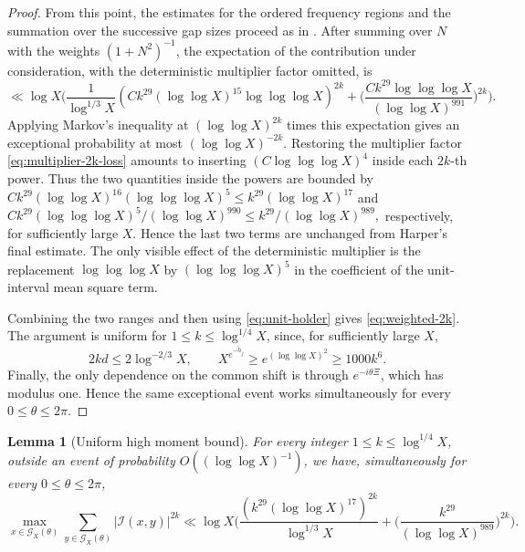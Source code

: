 \documentclass[a4paper,12pt,reqno]{amsart}
\numberwithin{equation}{section}
\newtheorem{lemma}[theorem]{Lemma}
\theoremstyle{remark}
\begin{document}
\begin{proof}
From this point, the estimates for the ordered frequency regions and
the summation over the successive gap sizes proceed as in
\cite[Section~3.4]{Harper2023Large}.  After summing over $N$ with the
weights $(1+N^2)^{-1}$, the expectation of the contribution under
consideration, with the deterministic multiplier factor omitted, is
\[
 \ll
 \log X\bigg(
 \frac1{\log^{1/3}X}
 \left(
 Ck^{29}(\log\log X)^{15}\log\log\log X
 \right)^{2k}
 +
 \bigg(
 \frac{Ck^{29}\log\log\log X}
 {(\log\log X)^{991}}
 \bigg)^{2k}
 \bigg).
\]
Applying Markov's inequality at $(\log\log X)^{2k}$ times this
expectation gives an exceptional probability at most
$(\log\log X)^{-2k}$.  Restoring the multiplier factor
\eqref{eq:multiplier-2k-loss} amounts to inserting
$(C\log\log\log X)^4$ inside each $2k$-th power.  Thus the two
quantities inside the powers are bounded by
\(
 Ck^{29}(\log\log X)^{16}(\log\log\log X)^5\le k^{29}(\log\log X)^{17}
\)
and
\(
 {Ck^{29}(\log\log\log X)^5}
 /{(\log\log X)^{990}}\le {k^{29}}/{(\log\log X)^{989}},
\)
respectively, for sufficiently large $X$.
Hence the last two terms are unchanged from Harper's final estimate.
The only visible effect of the deterministic multiplier is the
replacement
\(
 \log\log\log X\)
by \( (\log\log\log X)^5
\)
in the coefficient of the unit-interval mean square term.

Combining the two ranges and then using \eqref{eq:unit-holder} gives
\eqref{eq:weighted-2k}.  The argument is uniform for
$1\leq k\leq\log^{1/4}X$, since, for sufficiently large $X$,
\[
 2kd\leq2\log^{-2/3}X,
 \qquad
 X^{e^{-\widetilde h_j}}\geq e^{(\log\log X)^2}\geq1000k^6.
\]
Finally, the only dependence on the common shift is through
$e^{-i\theta\Xi}$, which has modulus one.  Hence the same exceptional
event works simultaneously for every $0\leq\theta\leq2\pi$.
\end{proof}

\begin{lemma}[Uniform high moment bound]
\label{lem:weighted-high-moment-simple}
For every integer $1\leq k\leq\log^{1/4}X$, outside an event of
probability $O((\log\log X)^{-1})$, we have, simultaneously for every
$0\leq\theta\leq2\pi$,
\begin{equation}\label{eq:weighted-2k-simple-statement}
 \max_{x\in{\mathcal G}_X(\theta)}
 \sum_{y\in{\mathcal G}_X(\theta)}|{\mathcal I}(x,y)|^{2k}
 \ll\log X\bigg(
 \frac{\left(k^{29}(\log\log X)^{17}\right)^{2k}}
 {\log^{1/3}X}
 +
 \bigg(\frac{k^{29}}{(\log\log X)^{989}}\bigg)^{2k}
 \bigg).
\end{equation}
\end{lemma}
\end{document}
